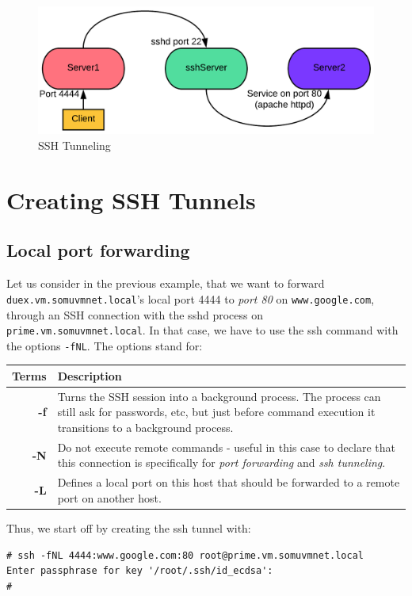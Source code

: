\begin{figure}[H]
	\centering
	\includegraphics[width=0.9\linewidth]{Mod4/chapters/4.14.a}
	\caption{SSH Tunneling}
	\label{fig:4}
\end{figure}

	\section{Creating SSH Tunnels}
\subsection{Local port forwarding}
Let us consider in the previous example, that we want to forward \verb|duex.vm.somuvmnet.local|'s local port 4444 to \textit{port 80} on \verb|www.google.com|, through an SSH connection with the sshd process on \verb|prime.vm.somuvmnet.local|. In that case, we have to use the ssh command with the options \verb|-fNL|. The options stand for:

\noindent
\begin{tabular}{rM{0.85}}
	\toprule
	\textbf{Terms} &\textbf{Description} \\
	\midrule
	\textbf{-f}	&Turns the SSH session into a background process. The process can still ask for passwords, etc, but just before command execution it transitions to a background process.\\
	\midrule
	\textbf{-N}	&Do not execute remote commands - useful in this case to declare that this connection is specifically for \textit{port forwarding} and \textit{ssh tunneling}.\\
	\midrule
	\textbf{-L}	&Defines a local port on this host that should be forwarded to a remote port on another host.\\
	\bottomrule
\end{tabular}

\noindent
Thus, we start off by creating the ssh tunnel with:

\vspace{-15pt}
\begin{verbatim}
# ssh -fNL 4444:www.google.com:80 root@prime.vm.somuvmnet.local 
Enter passphrase for key '/root/.ssh/id_ecdsa': 
#
\end{verbatim}
\vspace{-10pt}	

